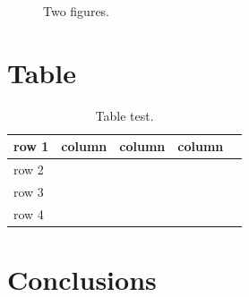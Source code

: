 \documentclass[11pt]{extarticle}
\begin{document}
\begin{figure}[ht!]
	\hfill 	
	\caption{Two figures.}
\end{figure}
 

\section{Table} 

\begin{table}[!h]
	\centering
		\caption{Table test.}
	\begin{tabular}{lllll} \hline
	row 1	& column  & column & column &  \\ \hline
	row 2	&  &  &  &  \\
	row 3	&  &  &  &  \\
	row 4	&  &  &  & \\ \hline
	\end{tabular}
\end{table}

\section{Conclusions} 

\end{document}
